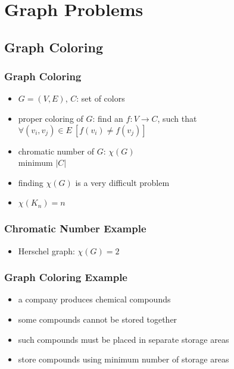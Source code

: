 \documentclass[dvipsnames]{beamer}
\begin{document}
\section{Graph Problems}

\subsection{Graph Coloring}

\begin{frame}
  \frametitle{Graph Coloring}

  \begin{itemize}
    \item $G=(V,E)$, $C$: set of colors
    \item \alert{proper coloring} of $G$: find an $f: V \rightarrow C$,
      such that\\
      $\forall (v_i,v_j) \in E~[f(v_i) \neq f(v_j)]$

    \pause
    \medskip
    \item \alert{chromatic number} of $G$: $\chi (G)$\\
      minimum $|C|$
     \item finding $\chi (G)$ is a very difficult problem

     \pause
     \smallskip
     \item $\chi (K_n) = n$
  \end{itemize}
\end{frame}

\begin{frame}
  \frametitle{Chromatic Number Example}

  \begin{center}
  \end{center}

  \begin{itemize}
    \item Herschel graph: $\chi (G)=2$
  \end{itemize}
\end{frame}

\begin{frame}
  \frametitle{Graph Coloring Example}

  \begin{itemize}
    \item a company produces chemical compounds
    \item some compounds cannot be stored together
    \item such compounds must be placed in separate storage areas

    \pause
    \medskip
    \item store compounds using minimum number of storage areas
  \end{itemize}
\end{frame}
\end{document}
